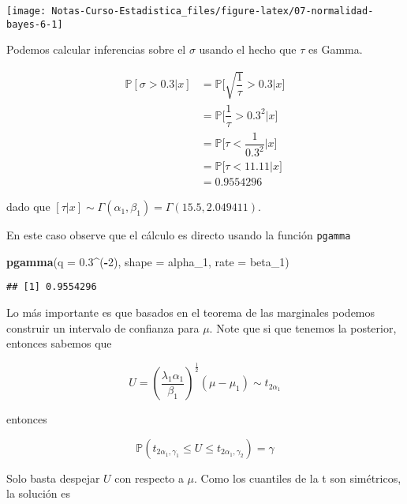 \documentclass[
  12pt,
]{book}
\newenvironment{Shaded}{\begin{snugshade}}{\end{snugshade}}
\newcommand{\DataTypeTok}[1]{\textcolor[rgb]{0.13,0.29,0.53}{#1}}
\newcommand{\DecValTok}[1]{\textcolor[rgb]{0.00,0.00,0.81}{#1}}
\newcommand{\FloatTok}[1]{\textcolor[rgb]{0.00,0.00,0.81}{#1}}
\newcommand{\KeywordTok}[1]{\textcolor[rgb]{0.13,0.29,0.53}{\textbf{#1}}}
\newcommand{\NormalTok}[1]{#1}
\newcommand{\OperatorTok}[1]{\textcolor[rgb]{0.81,0.36,0.00}{\textbf{#1}}}
\begin{document}
\begin{center}\texttt{[image: Notas-Curso-Estadistica\_files/figure-latex/07-normalidad-bayes-6-1]} \end{center}

Podemos calcular inferencias sobre el \(\sigma\) usando el hecho que \(\tau\)
es Gamma.

\begin{align*}
\mathbb P[\sigma>0.3|x] & = \mathbb P\bigg[\sqrt{\dfrac 1\tau} >0.3\bigg|x\bigg]\\
& = \mathbb P\bigg[\dfrac 1\tau >0.3^2\bigg|x\bigg]\\ 
& = \mathbb P\bigg[\tau <\dfrac 1{0.3^2}\bigg|x\bigg] \\ 
& = \mathbb P\bigg[\tau <11.11\bigg|x\bigg] \\ 
&=0.9554296
\end{align*}

dado que \([\tau|x] \sim \Gamma(\alpha_1,\beta_1) = \Gamma(15.5,2.049411)\).

En este caso observe que el cálculo es directo usando la función \texttt{pgamma}

\begin{Shaded}
\begin{Highlighting}[]
\KeywordTok{pgamma}\NormalTok{(}\DataTypeTok{q =} \FloatTok{0.3}\OperatorTok{\^{}}\NormalTok{(}\OperatorTok{{-}}\DecValTok{2}\NormalTok{), }\DataTypeTok{shape =}\NormalTok{ alpha\_}\DecValTok{1}\NormalTok{, }\DataTypeTok{rate =}\NormalTok{ beta\_}\DecValTok{1}\NormalTok{)}
\end{Highlighting}
\end{Shaded}

\begin{verbatim}
## [1] 0.9554296
\end{verbatim}

Lo más importante es que basados en el teorema de las marginales podemos
construir un intervalo de confianza para \(\mu\). Note que si que tenemos la
posterior, entonces sabemos que

\[U = \left(\dfrac{\lambda_1\alpha_1}{\beta_1}\right)^{\frac 12}(\mu-\mu_1) \sim t_{2\alpha_1} \]

entonces

\begin{equation*}
\mathbb P \left(t_{2\alpha_1, \gamma_1} \leq U \leq t_{2\alpha_1,
\gamma_2}\right) = \gamma
\end{equation*}

Solo basta despejar \(U\) con respecto a \(\mu\). Como los cuantiles de la t son
simétricos, la solución es
\end{document}
